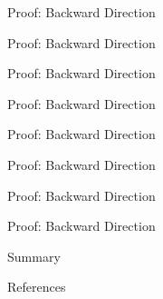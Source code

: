 \documentclass[9pt]{beamer}
\begin{document}
\begin{frame}{Proof: Backward Direction}
\end{frame}
\begin{frame}{Proof: Backward Direction}
\end{frame}
\begin{frame}{Proof: Backward Direction}
\end{frame}
\begin{frame}{Proof: Backward Direction}
\end{frame}
\begin{frame}{Proof: Backward Direction}
\end{frame}
\begin{frame}{Proof: Backward Direction}
\end{frame}
\begin{frame}{Proof: Backward Direction}
\end{frame}
\begin{frame}{Proof: Backward Direction}
\end{frame}

\begin{frame}{Summary}
\end{frame}
\begin{frame}{References}
\end{frame}
\end{document}
